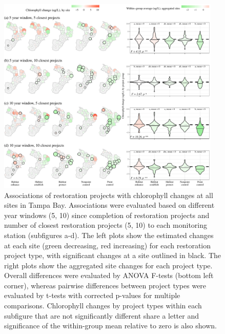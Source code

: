 \documentclass[]{article}
\begin{document}
\begin{figure}
\centerline{\includegraphics[width = 0.95\textwidth]{figs/prjsig.pdf}}
\caption{Associations of restoration projects with chlorophyll changes at all sites in Tampa Bay.  Associations were evaluated based on different year windows (5, 10) since completion of restoration projects and number of closest restoration projects (5, 10) to each monitoring station (subfigures a-d).  The left plots show the estimated changes at each site (green decreasing, red increasing) for each restoration project type, with significant changes at a site outlined in black.  The right plots show the aggregated site changes for each project type.  Overall differences were evaluated by ANOVA F-tests (bottom left corner), whereas pairwise differences between project types were evaluated by t-tests with corrected p-values for multiple comparisons.  Chlorophyll changes by project types within each subfigure that are not significantly different share a letter and significance of the within-group mean relative to zero is also shown.}
\label{fig:prjsig}
\end{figure}

\clearpage
\end{document}
